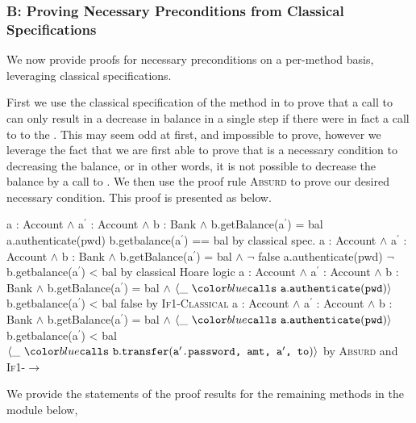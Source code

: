 \subsubsection{B: Proving Necessary Preconditions from Classical Specifications}
\label{s:BA-classical}
We now provide proofs for necessary preconditions on a per-method basis, leveraging 
classical specifications.

First we use the classical specification of the  method in  to prove that a call to  can only result in 
a decrease in balance in a single step if there were in fact a call to  to the . This may seem 
odd at first, and impossible to prove, however we leverage the fact that we are first able to prove that 
is a necessary condition to decreasing the balance, or in other words, it is not possible to decrease the balance by a
call to . We then use the proof rule \textsc{Absurd} to prove our desired necessary condition.
This proof is presented as  below.
\\
\noindent
{
	\begin{proofexample}
			{\proofstepwithrule
				{\hoareEx
						{a : Account $\wedge$ a$^\prime$ : Account $\wedge$ b : Bank $\wedge$ b.getBalance(a$^\prime$) = bal}
						{a.authenticate(pwd)}
						{b.getbalance(a$^\prime$) == bal}
						}
					{by classical spec.}
			}
			{\proofstepwithrule
				{\hoareEx
						{a : Account $\wedge$ a$^\prime$ : Account $\wedge$ b : Bank $\wedge$ b.getBalance(a$^\prime$) = bal $\wedge$ $\neg$ false}
						{a.authenticate(pwd)}
						{$\neg$ b.getbalance(a$^\prime$) < bal}
						}
					{by classical Hoare logic}
			}
			{\proofstepwithrule
				{\onlyIfSingleEx
						{a : Account $\wedge$ a$^\prime$ : Account $\wedge$ b : Bank $\wedge$ b.getBalance(a$^\prime$) = bal $\wedge$ $\calls{\_}{\prg{a}}{\prg{authenticate}}{\prg{pwd}}$}
						{b.getbalance(a$^\prime$) < bal}
						{false}
						}
					{by \textsc{If1-Classical}}
			}
			{\proofstepwithrule
				{\onlyIfSingleEx
						{a : Account $\wedge$ a$^\prime$ : Account $\wedge$ b : Bank $\wedge$ b.getBalance(a$^\prime$) = bal $\wedge$ $\calls{\_}{\prg{a}}{\prg{authenticate}}{\prg{pwd}}$}
						{b.getbalance(a$^\prime$) < bal}
						{$\calls{\_}{\prg{b}}{\prg{transfer}}{\prg{a$^\prime$.password, amt, a$^\prime$, to}}$}
						}
					{by \textsc{Absurd} and \textsc{If1-}$\longrightarrow$}
			}
		\endproofsteps
	\end{proofexample}
}
We provide the statements of the proof results for the remaining methods in the module below,
